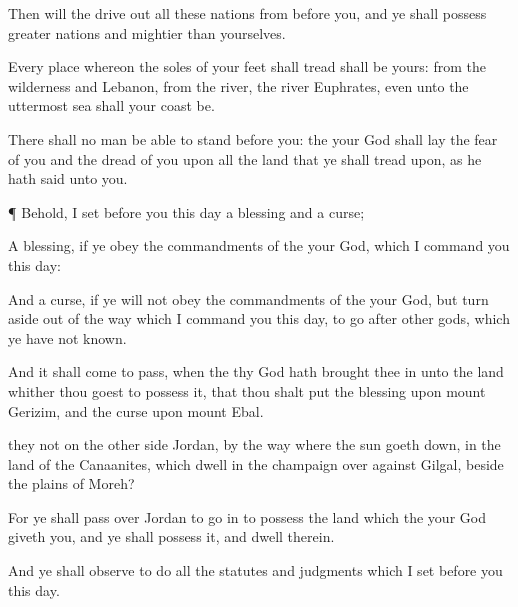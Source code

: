 {Then will the
{} drive
out all these
nations from
before you, and ye shall
possess
greater
nations and
mightier than yourselves.

Every
place whereon the
soles of your
feet shall
tread shall be yours: from the
wilderness and
Lebanon, from the
river, the
river
Euphrates, even unto the
uttermost
sea shall your
coast be.

There shall no
man be able to
stand
before you:
{} the
{} your
God shall
lay the
fear of you and the
dread of you
upon all the
land that ye shall
tread upon, as he hath
said unto you.


\par }{\PP {}¶
Behold, I
set
before you this
day a
blessing and a
curse;

A
blessing, if ye
obey the
commandments of the
{} your
God, which I
command you this
day:

And a
curse, if ye will not
obey the
commandments of the
{} your
God, but turn
aside out of the
way which I
command you this
day, to
go
after
other
gods, which ye have not
known.

And it shall come to pass, when the
{} thy
God hath brought thee
in unto the
land whither thou
goest to
possess it, that thou shalt
put the
blessing upon
mount
Gerizim, and the
curse upon
mount
Ebal.

 they not on the other
side
Jordan,
by the
way where the
sun goeth
down, in the
land of the
Canaanites, which
dwell in the
champaign over
against
Gilgal,
beside the
plains of
Moreh?

For ye shall pass
over
Jordan to go
in to
possess the
land which the
{} your
God
giveth you, and ye shall
possess it, and
dwell therein.

And ye shall
observe to
do all the
statutes and
judgments which I
set
before you this
day.




\par }
